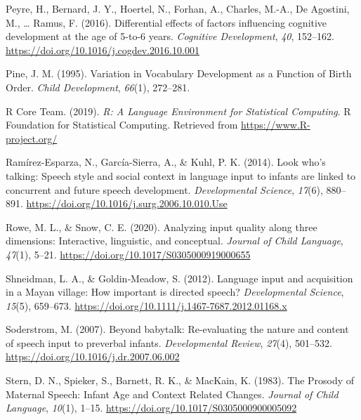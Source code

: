 \documentclass[
  man,mask,floatsintext]{apa6}
\newlength{\cslhangindent}
\newlength{\cslentryspacingunit} %
\newenvironment{CSLReferences}[2] %
 {%
  \setlength{\parindent}{0pt}
  \ifodd #1
  \let\oldpar\par
  \def\par{\hangindent=\cslhangindent\oldpar}
  \fi
  \setlength{\parskip}{#2\cslentryspacingunit}
 }%
 {}
\begin{document}
\begin{CSLReferences}{1}{0}
\leavevmode{}%
Peyre, H., Bernard, J. Y., Hoertel, N., Forhan, A., Charles, M.-A., De Agostini, M., \ldots{} Ramus, F. (2016). Differential effects of factors influencing cognitive development at the age of 5-to-6 years. \emph{Cognitive Development}, \emph{40}, 152--162. \url{https://doi.org/10.1016/j.cogdev.2016.10.001}

\leavevmode{}%
Pine, J. M. (1995). Variation in {Vocabulary} {Development} as a {Function} of {Birth} {Order}. \emph{Child Development}, \emph{66}(1), 272--281.

\leavevmode{}%
R Core Team. (2019). \emph{R: {A} {Language} {Environment} for {Statistical} {Computing}}. R Foundation for Statistical Computing. Retrieved from \url{https://www.R-project.org/}

\leavevmode{}%
Ramírez-Esparza, N., García-Sierra, A., \& Kuhl, P. K. (2014). Look who's talking: Speech style and social context in language input to infants are linked to concurrent and future speech development. \emph{Developmental Science}, \emph{17}(6), 880--891. \url{https://doi.org/10.1016/j.surg.2006.10.010.Use}

\leavevmode{}%
Rowe, M. L., \& Snow, C. E. (2020). Analyzing input quality along three dimensions: Interactive, linguistic, and conceptual. \emph{Journal of Child Language}, \emph{47}(1), 5--21. \url{https://doi.org/10.1017/S0305000919000655}

\leavevmode{}%
Shneidman, L. A., \& Goldin‐Meadow, S. (2012). Language input and acquisition in a {Mayan} village: How important is directed speech? \emph{Developmental Science}, \emph{15}(5), 659--673. \url{https://doi.org/10.1111/j.1467-7687.2012.01168.x}

\leavevmode{}%
Soderstrom, M. (2007). Beyond babytalk: {Re}-evaluating the nature and content of speech input to preverbal infants. \emph{Developmental Review}, \emph{27}(4), 501--532. \url{https://doi.org/10.1016/j.dr.2007.06.002}

\leavevmode{}%
Stern, D. N., Spieker, S., Barnett, R. K., \& MacKain, K. (1983). The {Prosody} of {Maternal} {Speech}: {Infant} {Age} and {Context} {Related} {Changes}. \emph{Journal of Child Language}, \emph{10}(1), 1--15. \url{https://doi.org/10.1017/S0305000900005092}


\end{CSLReferences}
\end{document}
